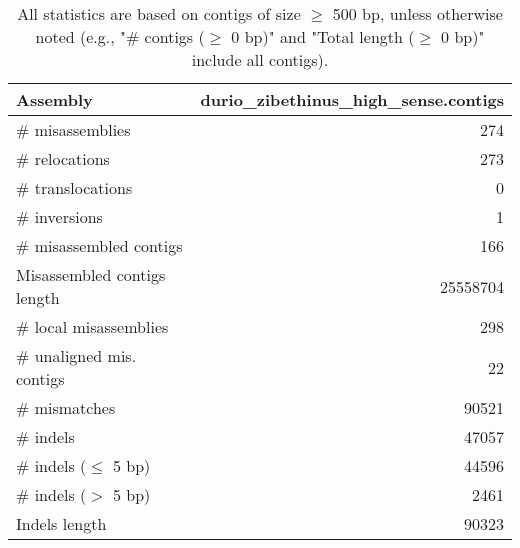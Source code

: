 \documentclass[12pt,a4paper]{article}
\begin{document}
\begin{table}[ht]
\begin{center}
\caption{All statistics are based on contigs of size $\geq$ 500 bp, unless otherwise noted (e.g., "\# contigs ($\geq$ 0 bp)" and "Total length ($\geq$ 0 bp)" include all contigs).}
\begin{tabular}{|l*{1}{|r}|}
\hline
Assembly & durio\_zibethinus\_high\_sense.contigs \\ \hline
\# misassemblies & 274 \\ \hline
\hspace{5mm}\# relocations & 273 \\ \hline
\hspace{5mm}\# translocations & 0 \\ \hline
\hspace{5mm}\# inversions & 1 \\ \hline
\# misassembled contigs & 166 \\ \hline
Misassembled contigs length & 25558704 \\ \hline
\# local misassemblies & 298 \\ \hline
\# unaligned mis. contigs & 22 \\ \hline
\# mismatches & 90521 \\ \hline
\# indels & 47057 \\ \hline
\hspace{5mm}\# indels ($\leq$ 5 bp) & 44596 \\ \hline
\hspace{5mm}\# indels ($>$ 5 bp) & 2461 \\ \hline
Indels length & 90323 \\ \hline
\end{tabular}
\end{center}
\end{table}
\end{document}
